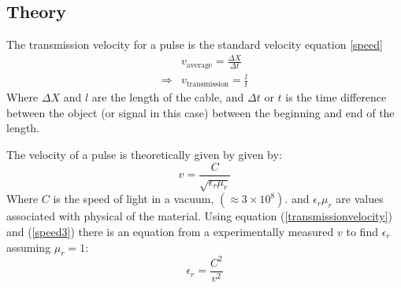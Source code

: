 \subsection{Theory \label{theory}}
The transmission velocity for a pulse is the standard velocity equation \ref{speed}
\begin{align}
&v_{\text{average}} = \frac{\Delta X}{\Delta t}   \label{speed}\\ 
\Rightarrow &v_{\text{transmission}} = \frac{l}{t} \label{transmissionvelocity}
\end{align}
Where $\Delta X$ and $l$ are the length of the cable, and
$\Delta t$ or $t$ is the time difference between the object (or signal in this case) between the beginning and end
of the length.

The velocity of a pulse is theoretically given by given by:
\begin{equation}
v = \frac{C}{\sqrt{\epsilon_r \mu_r}}\label{speed3}
\end{equation}
Where $C$ is the speed of light in a vacuum, $(\approx 3\times 10 ^8)$.
and $\epsilon_r \mu_r$ are values associated with physical of the material.
Using equation (\ref{transmissionvelocity}) and (\ref{speed3})
there is an equation from a experimentally measured $v$ to find $\epsilon_r$ assuming $\mu_r =1$:
\begin{equation}
\epsilon_r = \frac{C^2}{v^2} \label{er}
\end{equation}



